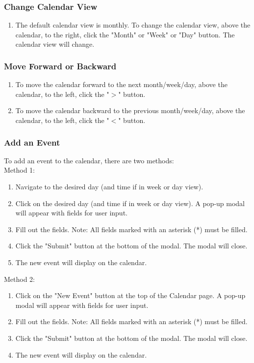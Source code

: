 \documentclass[12pt]{article}
\begin{document}
    \subsubsection{Change Calendar View}
    \begin{enumerate}
        \item The default calendar view is monthly. To change the calendar view, above the calendar, to the right, click the "Month" or "Week" or "Day" button. The calendar view will change.
    \end{enumerate}
    
    \subsubsection{Move Forward or Backward}
    \begin{enumerate}
        \item To move the calendar forward to the next month/week/day,  above the calendar, to the left, click the "$>$" button.
        \item To move the calendar backward to the previous month/week/day,  above the calendar, to the left, click the "$<$" button.
    \end{enumerate}
    
    \subsubsection{Add an Event}
    To add an event to the calendar, there are two methods: \\
    Method 1:
    \begin{enumerate}
        \item Navigate to the desired day (and time if in week or day view).
        \item Click on the desired day (and time if in week or day view). A pop-up modal will appear with fields for user input.
        \item Fill out the fields. Note: All fields marked with an asterisk (*) must be filled.
        \item Click the "Submit" button at the bottom of the modal. The modal will close.
        \item The new event will display on the calendar.
    \end{enumerate}
    Method 2:
    \begin{enumerate}
        \item Click on the "New Event" button at the top of the Calendar page. A pop-up modal will appear with fields for user input.
        \item Fill out the fields. Note: All fields marked with an asterisk (*) must be filled.
        \item Click the "Submit" button at the bottom of the modal. The modal will close.
        \item The new event will display on the calendar.
    \end{enumerate}
    
\end{document}
